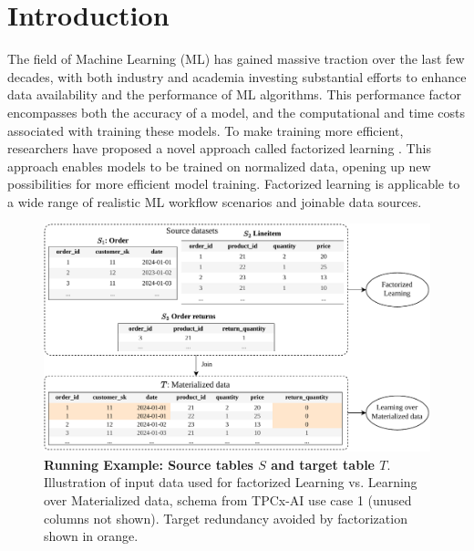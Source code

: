 
\chapter{Introduction}
\label{chapter:introduction}

The field of Machine Learning (ML) has gained massive traction over the last few decades, with both industry and academia investing substantial efforts to enhance data availability and the performance of ML algorithms. This performance factor encompasses both the accuracy of a model, and the computational and time costs associated with training these models.  To make training more efficient, researchers have proposed a novel approach called factorized learning \cite{orion_learning_gen_lin_models}. This approach enables models to be trained on normalized data, opening up new possibilities for more efficient model training. Factorized learning is applicable to a wide range of realistic ML workflow scenarios and joinable data sources.

\begin{figure}[h]
    \centering
    \includegraphics[width=0.95\linewidth]{chapters/01_introduction/figures/running-example-intro.pdf}
    \caption[Running Example: Source tables $S$ and target table $T$]{\textbf{Running Example: Source tables $S$ and target table $T$}. \\ Illustration of input data used for factorized Learning vs. Learning over Materialized data, schema from TPCx-AI \cite{tpcx-ai} use case 1 (unused columns not shown). Target redundancy avoided by factorization shown in orange.}
    \label{fig:running-example-fac-vs-mat}
\end{figure}

